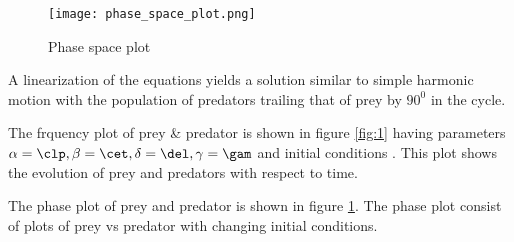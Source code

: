 \documentclass{article}
\begin{document}
\begin{figure}[h]
\begin{center}
\texttt{[image: phase\_space\_plot.png]}
\caption{Phase space plot}\label{fig:2}
\end{center}
\end{figure}

A linearization of the equations yields a solution similar to simple harmonic motion with the population of predators trailing that of prey by $90^0$ in the cycle.

The frquency plot of prey \& predator is shown in figure \ref{fig:1} having parameters $\alpha = \clp, \beta = \cet, \delta = \del, \gamma = \gam$ and initial conditions \init. This plot shows the evolution of prey and predators with respect to time.

The phase plot of prey and predator is shown in figure \ref{fig:2}. The phase plot consist of plots of prey vs predator with changing initial conditions. 




\newpage


\end{document}
